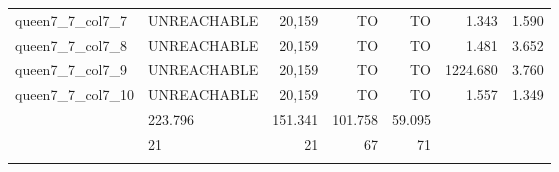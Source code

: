 \begin{tabular}{llr|rrrr}
  queen7\_7\_col7\_7 & UNREACHABLE & 20,159 & TO & TO & 1.343 & 1.590 \\
  queen7\_7\_col7\_8 & UNREACHABLE & 20,159 & TO & TO & 1.481 & 3.652 \\
  queen7\_7\_col7\_9 & UNREACHABLE & 20,159 & TO & TO & 1224.680 & 3.760 \\ \hline
  queen7\_7\_col7\_10 & UNREACHABLE & 20,159 & TO & TO & 1.557 & 1.349 \\ \bhline
  \multicolumn{2}{r|}{平均CPUTime} & 223.796 & 151.341 & 101.758 & 59.095 \\ \bhline
  \multicolumn{2}{r|}{解けた問題数} & 21 & 21 & 67 & 71 \\ \bhline
\end{tabular}